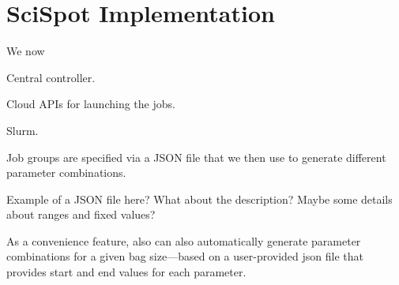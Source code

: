\section{SciSpot Implementation}

We now 

Central controller.

Cloud APIs for launching the jobs.

Slurm.

Job groups are specified via a JSON file that we then use to generate different parameter combinations.

Example of a JSON file here? What about the description? Maybe some details about ranges and fixed values? 


As a convenience feature, \sysname also can also automatically generate parameter combinations for a given bag size---based on a user-provided json file that provides start and end values for each parameter.


